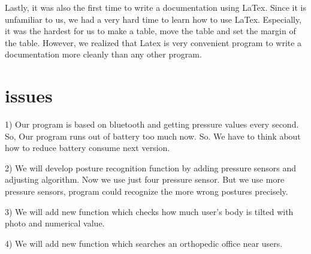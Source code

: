 \documentclass[conference]{IEEEtran}
\begin{document}
Lastly, it was also the first time to write a documentation using LaTex. Since it is unfamiliar to us, we had a very hard time to learn how to use LaTex. Especially, it was the hardest for us to make a table, move the table and set the margin of the table. However, we realized that Latex is very convenient program to write a documentation more cleanly than any other program.
 

\section{issues}


1) Our program is based on bluetooth and getting pressure values every second. So, Our program runs out of battery too much now. So. We have to think about how to reduce battery consume next version.

2) We will develop posture recognition function by adding pressure sensors and adjusting algorithm. Now we use just four pressure sensor. But we use more pressure sensors, program could recognize the more wrong postures precisely.

3) We will add new function which checks how much user's body is tilted with photo and numerical value.

4) We will add new function which searches an orthopedic office near users. 













%
%
%




\end{document}
